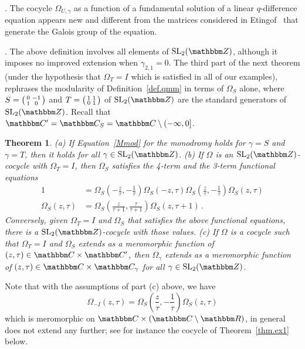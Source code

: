 \documentclass[12pt,reqno]{amsart}
\newtheorem{theorem}{Theorem}[section]
\theoremstyle{definition}
\def\BZ{\mathbbm Z}
\def\BR{\mathbbm R}
\def\BC{\mathbbm C}
\def\SL{\mathrm{SL}}
\def\be{\begin{equation}}
\def\ee{\end{equation}}
\def\Om{\Omega}
\def\sma#1#2#3#4{\bigl(\smallmatrix#1&#2\\#3&#4\endsmallmatrix\bigr)} %
\begin{document}
. %
The cocycle $\Omega_{U,\gamma}$ as a function of a fundamental solution of a
linear $q$-difference equation appears new and different from the matrices
considered in Etingof~\cite{Etingof} that generate the Galois group of the equation.

. %
The above definition involves all elements of $\SL_2(\BZ)$, although it
imposes no improved extension when $\gamma_{2,1}=0$.  The third part of the next
theorem (under the hypothesis that $\Om_T=I$ which is satisfied in all of our
examples), rephrases the modularity of Definition~\ref{def.qmm}
in terms of $\Om_S$ alone, where $S=\sma 0{-1}10$ and $T=\sma 1101$ of
$\SL_2(\BZ)$ are the standard generators of $\SL_2(\BZ)$. Recall that
$\BC'=\BC_S=\BC\setminus(-\infty,0]$.  

\begin{theorem}
\label{thm.ST}
{\rm (a)} If Equation~\eqref{Mmod} for the monodromy holds for $\gamma=S$
and $\gamma=T$, then it holds for all $\gamma \in \SL_2(\BZ)$.
\newline
{\rm (b)} If $\Om$ is an $\SL_2(\BZ)$-cocycle with $\Om_T=I$, then $\Om_S$
satisfies the 4-term and the 3-term functional equations
\begin{subequations}
\begin{align}
  \label{OmS1}
  1 &= 
  \Om_S\left(-\frac{z}{\tau},-\frac{1}{\tau}\right)
  \Om_S\left(-z,\tau\right)
  \Om_S\left(\frac{z}{\tau},-\frac{1}{\tau}\right)
  \Om_S(z,\tau) \\
  \label{OmS2}
  \Om_S(z,\tau) &= \Om_S\left(\frac{z}{\tau+1}, \frac{\tau}{\tau+1}\right)
  \Om_S(z,\tau+1) \,.
\end{align}
\end{subequations}
Conversely, given $\Om_T=I$ and $\Om_S$ that satisfies the above functional
equations, there is a $\SL_2(\BZ)$-cocycle with those values.
\newline
{\rm (c)} If $\Omega$ is a cocycle such that $\Om_T=I$ and $\Om_S$ extends as
a meromorphic function of $(z,\tau) \in \BC \times \BC'$, then $\Om_\gamma$
extends as a meromorphic function of $(z,\tau) \in \BC \times \BC_\gamma$
for all $\gamma \in \SL_2(\BZ)$. 
\end{theorem}

Note that with the assumptions of part (c) above, we have
\be
\label{Om-I}
\Om_{-I}(z,\tau) = \Om_S\left(\frac{z}{\tau},-\frac{1}{\tau}\right)
\Om_S(z,\tau)
\ee
which is meromorphic on $\BC\times (\BC\setminus\BR)$, in general does not extend
any further; see for instance the cocycle of Theorem~\ref{thm.ex1} below.
\end{document}
